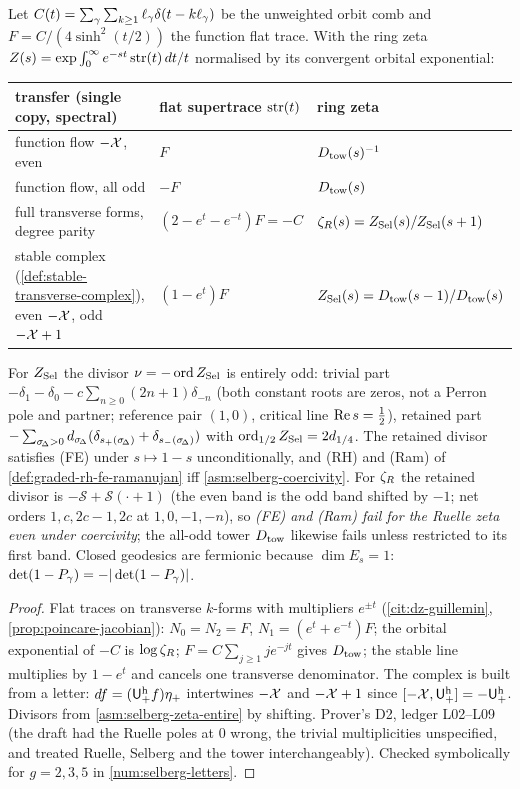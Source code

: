 \begin{theorem}
\label{thm:selberg-two-term-ring-zeta}
Let $C(t) = \sum_\gamma\sum_{k\ge1}\ell_\gamma\delta(t-k\ell_\gamma)$ be the unweighted orbit comb
and $F = C/(4\sinh^2(t/2))$ the function flat trace. With the ring zeta
$Z(s) = \exp\int_0^\infty e^{-st}\operatorname{str}(t)\,dt/t$ normalised by its convergent orbital exponential:
\begin{center}\small
\begin{tabular}{lll}
\toprule
transfer (single copy, spectral) & flat supertrace $\operatorname{str}(t)$ & ring zeta \\
\midrule
function flow $-\mathcal X$, even & $F$ & $D_{\mathrm{tow}}(s)^{-1}$ \\
function flow, all odd & $-F$ & $D_{\mathrm{tow}}(s)$ \\
full transverse forms, degree parity & $(2-e^t-e^{-t})F = -C$ & $\zeta_{R}(s) = Z_{\mathrm{Sel}}(s)/Z_{\mathrm{Sel}}(s+1)$ \\
stable complex (\cref{def:stable-transverse-complex}), even $-\mathcal X$, odd $-\mathcal X+1$ & $(1-e^t)F$ & $Z_{\mathrm{Sel}}(s) = D_{\mathrm{tow}}(s-1)/D_{\mathrm{tow}}(s)$ \\
\bottomrule
\end{tabular}
\end{center}
For $Z_{\mathrm{Sel}}$ the divisor $\nu = -\operatorname{ord}Z_{\mathrm{Sel}}$ is entirely odd: trivial part
$-\delta_1-\delta_0-c\sum_{n\ge0}(2n+1)\delta_{-n}$ (both constant roots are zeros, not a Perron
pole and partner; reference pair $(1,0)$, critical line $\operatorname{Re} s = \tfrac12$), retained part
$-\sum_{\sigma_{\!\Delta}>0}d_{\sigma_{\!\Delta}}(\delta_{s_+(\sigma_{\!\Delta})}+\delta_{s_-(\sigma_{\!\Delta})})$ with
$\operatorname{ord}_{1/2}Z_{\mathrm{Sel}} = 2d_{1/4}$. The retained divisor satisfies (FE) under $s\mapsto1-s$
unconditionally, and (RH) and (Ram) of \cref{def:graded-rh-fe-ramanujan} iff
\cref{asm:selberg-coercivity}. For $\zeta_{R}$ the retained divisor is $-\mathcal S+\mathcal S(\cdot+1)$
(the even band is the odd band shifted by $-1$; net orders $1,c,2c-1,2c$ at $1,0,-1,-n$), so
\emph{(FE) and (Ram) fail for the Ruelle zeta even under coercivity}; the all-odd tower
$D_{\mathrm{tow}}$ likewise fails unless restricted to its first band. Closed geodesics are fermionic
because $\dim E_s = 1$: $\det(1-P_{\gamma}) = -|\det(1-P_{\gamma})|$.
\end{theorem}
\begin{proof}
Flat traces on transverse $k$-forms with multipliers $e^{\pm t}$ (\cref{cit:dz-guillemin},
\cref{prop:poincare-jacobian}): $N_0 = N_2 = F$, $N_1 = (e^t+e^{-t})F$; the orbital exponential
of $-C$ is $\log\zeta_{R}$; $F = C\sum_{j\ge1}je^{-jt}$ gives $D_{\mathrm{tow}}$; the stable line multiplies by
$1-e^t$ and cancels one transverse denominator. The complex is built from a letter:
$df = ({\mathsf U^{\mathrm h}_{+}}f)\eta_+$ intertwines $-\mathcal X$ and $-\mathcal X+1$ since $[-\mathcal X,{\mathsf U^{\mathrm h}_{+}}] = -{\mathsf U^{\mathrm h}_{+}}$.
Divisors from \cref{asm:selberg-zeta-entire} by shifting. Prover's D2, ledger L02--L09 (the draft
had the Ruelle poles at $0$ wrong, the trivial multiplicities unspecified, and treated Ruelle,
Selberg and the tower interchangeably). Checked symbolically for $g = 2,3,5$ in
\cref{num:selberg-letters}.
\end{proof}

